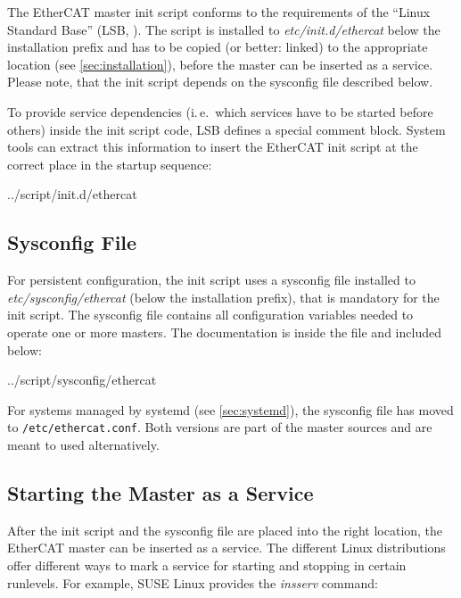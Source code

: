 \documentclass[a4paper,12pt,BCOR6mm,bibtotoc,idxtotoc]{scrbook}
\begin{document}
The EtherCAT master init script conforms to the requirements of the ``Linux
Standard Base'' (LSB, \cite{lsb}). The script is installed to
\textit{etc/init.d/ethercat} below the installation prefix and has to be
copied (or better: linked) to the appropriate location (see
\autoref{sec:installation}), before the master can be inserted as a service.
Please note, that the init script depends on the sysconfig file described
below.

To provide service dependencies (i.\,e.\ which services have to be started
before others) inside the init script code, LSB defines a special comment
block. System tools can extract this information to insert the EtherCAT init
script at the correct place in the startup sequence:


    {../script/init.d/ethercat}

\subsection{Sysconfig File}
\label{sec:sysconfig}

For persistent configuration, the init script uses a sysconfig file installed
to \textit{etc/sysconfig/ethercat} (below the installation prefix), that is
mandatory for the init script. The sysconfig file contains all configuration
variables needed to operate one or more masters. The documentation is inside
the file and included below:


    {../script/sysconfig/ethercat}

For systems managed by systemd (see \autoref{sec:systemd}), the sysconfig file
has moved to \lstinline+/etc/ethercat.conf+. Both versions are part of the
master sources and are meant to used alternatively.

\subsection{Starting the Master as a Service}
\label{sec:service}

After the init script and the sysconfig file are placed into the right
location, the EtherCAT master can be inserted as a service. The different Linux
distributions offer different ways to mark a service for starting and stopping
in certain runlevels. For example, SUSE Linux provides the \textit{insserv}
command:
\end{document}
